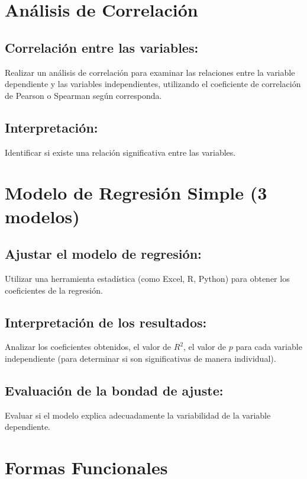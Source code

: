 \documentclass[10pt]{article}
\begin{document}
\section{Análisis de Correlación}
\subsection{Correlación entre las variables:}
Realizar un análisis de correlación para examinar las relaciones entre la variable dependiente y las variables independientes, utilizando el coeficiente de correlación de Pearson o Spearman según corresponda.

\subsection{Interpretación:}
Identificar si existe una relación significativa entre las variables.
\section{Modelo de Regresión Simple (3 modelos)}
\subsection{Ajustar el modelo de regresión:}
Utilizar una herramienta estadística (como Excel, R, Python) para obtener los coeficientes de la regresión.

\subsection{Interpretación de los resultados:}
Analizar los coeficientes obtenidos, el valor de \(R^2\), el valor de \(p\) para cada variable independiente (para determinar si son significativas de manera individual).

\subsection{Evaluación de la bondad de ajuste:}
Evaluar si el modelo explica adecuadamente la variabilidad de la variable dependiente.
\section{Formas Funcionales}
\end{document}
